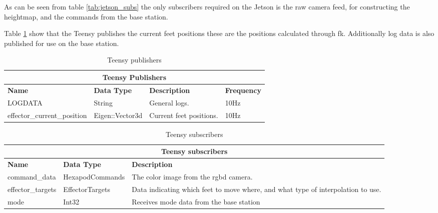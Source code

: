         As can be seen from table \ref{tab:jetson_subs} the only subscribers required on the Jetson is the raw camera feed, 
        for constructing the heightmap, and the commands from the base station.

        Table \ref{tab:teensy_pubs} show that the Teensy publishes the current feet positions these are the positions calculated through \ac{fk}. Additionally
        log data is also published for use on the base station.
        \begin{table}[h]
            \begin{tabularx}{\textwidth}{| l | l | X | l |}
                \hline
                \multicolumn{4}{|c|}{\textbf{Teensy Publishers}} \\ \hline
                \textbf{Name} & \textbf{Data Type} & \textbf{Description} & \textbf{Frequency} \\ \hline
                LOGDATA & String & General logs. & 10Hz \\ \hline
                effector\_current\_position & Eigen::Vector3d & Current feet positions. & 10Hz \\ \hline
            \end{tabularx}
            \caption{Teensy publishers}
            \label{tab:teensy_pubs}
        \end{table}
        \begin{table}[h]
            \centering
            \begin{tabularx}{\textwidth}{| l | l | X |}
                \hline
                \multicolumn{3}{|c|}{\textbf{Teensy subscribers}} \\ \hline
                \textbf{Name} & \textbf{Data Type} & \textbf{Description} \\ \hline
                command\_data & HexapodCommands & The color image from the \ac{rgbd} camera. \\ \hline
                effector\_targets & EffectorTargets & Data indicating which feet to move where, and what type of interpolation to use.\\ \hline
                mode & Int32 & Receives mode data from the base station \\ \hline
            \end{tabularx}
            \caption{Teensy subscribers}
            \label{tab:teensy_subs}
        \end{table}

